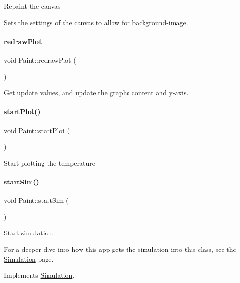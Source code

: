 Repaint the canvas

Sets the settings of the canvas to allow for background-\/image. \mbox{\label{classPaint_a9790e137dfd6386ed72aea47f176326d}} 
\paragraph{\texorpdfstring{redrawPlot}{redrawPlot}}
{\footnotesize\ttfamily void Paint\+::redraw\+Plot (\begin{DoxyParamCaption}{ }\end{DoxyParamCaption})\hspace{0.3cm}{\ttfamily [slot]}}

Get update values, and update the graph\textquotesingle{}s content and y-\/axis. \mbox{\label{classPaint_ab8c4d8cbf3999cd2b80b299587ec9e83}} 
\paragraph{\texorpdfstring{startPlot()}{startPlot()}}
{\footnotesize\ttfamily void Paint\+::start\+Plot (\begin{DoxyParamCaption}{ }\end{DoxyParamCaption})}

Start plotting the temperature \mbox{\label{classPaint_a1f01fcd27e595cc9aacd1ef94e3e1454}} 
\paragraph{\texorpdfstring{startSim()}{startSim()}}
{\footnotesize\ttfamily void Paint\+::start\+Sim (\begin{DoxyParamCaption}{ }\end{DoxyParamCaption})\hspace{0.3cm}{\ttfamily [virtual]}}

Start simulation.

For a deeper dive into how this app gets the simulation into this class, see the \mbox{\hyperlink{classSimulation}{Simulation}} page. 

Implements \mbox{\hyperlink{classSimulation_ac523544ffc2b4cffed1d2a6ead5809b1}{Simulation}}.



